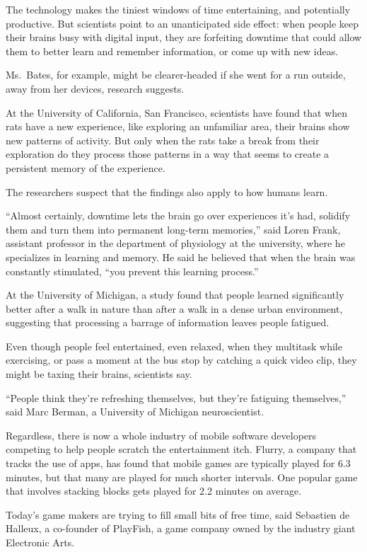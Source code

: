 ﻿\documentclass[12pt]{article}
\begin{document}
The technology makes the tiniest windows of time entertaining, and potentially productive. But
scientists point to an unanticipated side effect: when people keep their brains busy with digital
input, they are forfeiting downtime that could allow them to better learn and remember information,
or come up with new ideas.

Ms.~Bates, for example, might be clearer-headed if she went for a run outside, away from her
devices, research suggests.

At the University of California, San Francisco, scientists have found that when rats have a new
experience, like exploring an unfamiliar area, their brains show new patterns of activity. But only
when the rats take a break from their exploration do they process those patterns in a way that seems
to create a persistent memory of the experience.

The researchers suspect that the findings also apply to how humans learn.

``Almost certainly, downtime lets the brain go over experiences it's had, solidify them and turn
them into permanent long-term memories,'' said Loren Frank, assistant professor in the department of
physiology at the university, where he specializes in learning and memory. He said he believed that
when the brain was constantly stimulated, ``you prevent this learning process.''

At the University of Michigan, a study found that people learned significantly better after a walk
in nature than after a walk in a dense urban environment, suggesting that processing a barrage of
information leaves people fatigued.

Even though people feel entertained, even relaxed, when they multitask while exercising, or pass a
moment at the bus stop by catching a quick video clip, they might be taxing their brains, scientists
say.

``People think they're refreshing themselves, but they're fatiguing themselves,'' said Marc Berman,
a University of Michigan neuroscientist.

Regardless, there is now a whole industry of mobile software developers competing to help people
scratch the entertainment itch. Flurry, a company that tracks the use of apps, has found that mobile
games are typically played for 6.3 minutes, but that many are played for much shorter intervals. One
popular game that involves stacking blocks gets played for 2.2 minutes on average.

Today's game makers are trying to fill small bits of free time, said Sebastien de Halleux, a
co-founder of PlayFish, a game company owned by the industry giant Electronic Arts.
\end{document}

